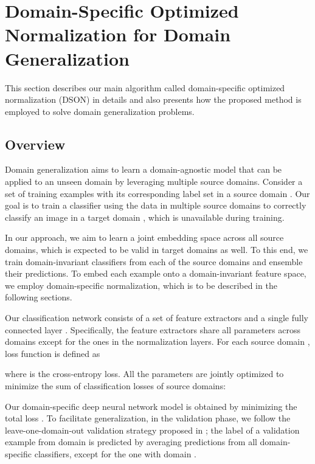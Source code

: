 \documentclass[runningheads]{llncs}
\begin{document}
\section{Domain-Specific Optimized Normalization for Domain Generalization}
\label{sec:method}
This section describes our main algorithm called domain-specific optimized normalization (DSON) in details and also presents how the proposed method is employed to solve domain generalization problems.


\subsection{Overview}

Domain generalization aims to learn a domain-agnostic model that can be applied to an unseen domain by leveraging multiple source domains.
Consider a set of training examples  with its corresponding label set  in a source domain .
Our goal is to train a classifier using the data in multiple source domains  to correctly classify an image  in a target domain , which is unavailable during training.


In our approach, we aim to learn a joint embedding space across all source domains, which is expected to be valid in target domains as well.
To this end, we train domain-invariant classifiers from each of the source domains and ensemble their predictions.
To embed each example onto a domain-invariant feature space, we employ domain-specific normalization, which is to be described in the following sections.

Our classification network consists of a set of feature extractors  and a single fully connected layer .
Specifically, the feature extractors share all parameters across domains except for the ones in the normalization layers.
For each source domain , loss function is defined as

where  is the cross-entropy loss.
All the parameters are jointly optimized to minimize the sum of classification losses of source domains:

Our domain-specific deep neural network model is obtained by minimizing the total loss .
{\color{black}
To facilitate generalization, in the validation phase, we follow the leave-one-domain-out validation strategy proposed in \cite{dinnocente2018domain};
the label of a validation example from domain  is predicted by averaging predictions from all domain-specific classifiers, except for the one with domain .
}
\end{document}
